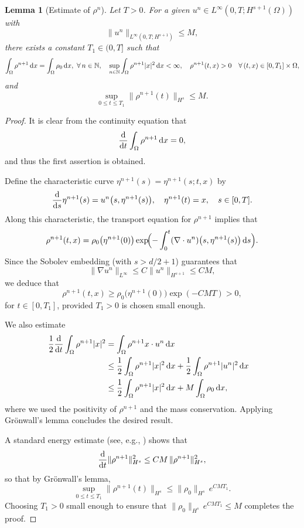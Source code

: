 \documentclass[10pt, reqno]{amsart}
\newtheorem{lemma}[theorem]{Lemma}
\theoremstyle{definition}
\theoremstyle{remark}
\numberwithin{equation}{section}
\newcommand{\dx}{\textnormal{d}x}
\newcommand{\ds}{\textnormal{d}s}
\newcommand{\ddt}{\frac{\textnormal{d}}{\textnormal{d}t}}
\newcommand{\dds}{\frac{\textnormal{d}}{\textnormal{d}s}}
\newcommand{\N}{\mathbb{N}}
\begin{document}
\begin{lemma}[Estimate of $\rho^n$]\label{lem_rho}
Let $T>0$. For a given $u^n \in L^\infty(0,T; H^{s+1}(\Omega))$ with
\[
\|u^n\|_{L^\infty(0,T; H^{s+1})} \le M,
\]
there exists a constant $T_1 \in (0,T]$ such that
\[
\int_{\Omega} \rho^{n+1}\,\dx = \int_{\Omega} \rho_0\,\dx, \ \forall \, n \in \N,  \quad \sup_{n \in \N}\int_{\Omega} \rho^{n+1} |x|^2\,\dx < \infty,
\quad
\rho^{n+1}(t,x) > 0 \quad \forall \, (t,x) \in [0,T_1]\times \Omega,
\]
and
\[
\sup_{0\le t\le T_1} \|\rho^{n+1}(t)\|_{H^s} \le M.
\]
\end{lemma}
\begin{proof}It is clear from the continuity equation that
\[
\ddt\int_{\Omega} \rho^{n+1}\,\dx = 0,
\]
and thus the first assertion is obtained. 

Define the characteristic curve $\eta^{n+1}(s) = \eta^{n+1}(s;t,x)$ by
\[
\dds\eta^{n+1}(s) = u^n\bigl(s, \eta^{n+1}(s)\bigr), \quad \eta^{n+1}(t)=x, \quad s\in [0,T].
\]
Along this characteristic, the transport equation for $\rho^{n+1}$ implies that
\[
\rho^{n+1}(t,x) = \rho_0\bigl(\eta^{n+1}(0)\bigr) \exp\!\Bigl(-\int_0^t (\nabla \cdot u^n)\bigl(s, \eta^{n+1}(s)\bigr)\, \ds\Bigr).
\]
Since the Sobolev embedding (with $s > d/2+1$) guarantees that
\[
\|\nabla u^n\|_{L^\infty} \le C \|u^n\|_{H^{s+1}} \le C M,
\]
we deduce that
\[
\rho^{n+1}(t,x) \ge \rho_0\bigl(\eta^{n+1}(0)\bigr)\exp(-CMT) > 0,
\]
for $t\in [0,T_1]$, provided $T_1>0$ is chosen small enough. 


We also estimate
\begin{align*}
\frac12\ddt\int_{\Omega} \rho^{n+1} |x|^2 &= \int_{\Omega} \rho^{n+1} x \cdot u^n\,\dx \cr
&\leq \frac12\int_{\Omega} \rho^{n+1} |x|^2\,\dx + \frac12 \int_{\Omega} \rho^{n+1} |u^n|^2\,\dx \cr
&\leq \frac12\int_{\Omega} \rho^{n+1} |x|^2\,\dx + M \int_{\Omega} \rho_0\,\dx,
\end{align*}
where we used the positivity of $\rho^{n+1}$ and the mass conservation. Applying Gr\"onwall's lemma concludes the desired result.



A standard energy estimate (see, e.g., \cite[Appendix A]{CK16}) shows that
\[
\ddt \|\rho^{n+1}\|_{H^s}^2 \le C M\, \|\rho^{n+1}\|_{H^s}^2,
\]
so that by Gr\"onwall's lemma,
\[
\sup_{0\le t\le T_1}\|\rho^{n+1}(t)\|_{H^s} \le \|\rho_0\|_{H^s}\, e^{CMT_1}.
\]
Choosing $T_1>0$ small enough to ensure that $\|\rho_0\|_{H^s}\, e^{CMT_1} \le M$ completes the proof.
\end{proof}
\end{document}
